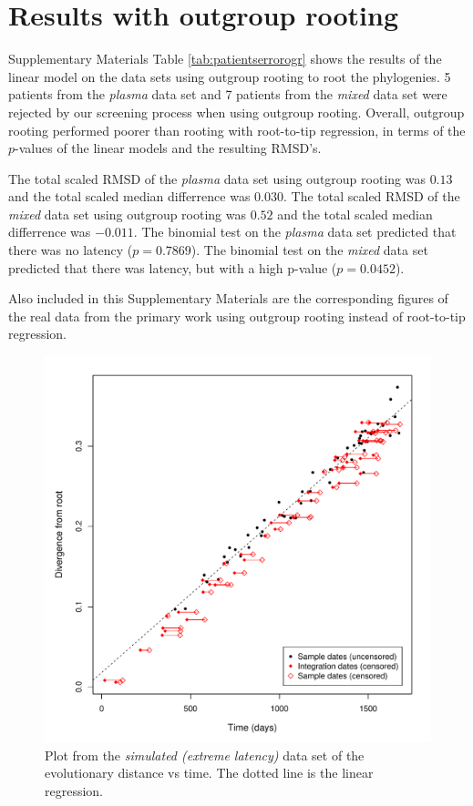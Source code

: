 \documentclass[12pt]{article}
\begin{document}
\section{Results with outgroup rooting} \label{sec:ogr}
Supplementary Materials Table \ref{tab:patientserrorogr} shows the results of the linear model on the data sets using outgroup rooting \cite{Huelsenbeck02} to root the phylogenies.
5 patients from the \emph{plasma} data set and 7 patients from the \emph{mixed} data set were rejected by our screening process when using outgroup rooting.
Overall, outgroup rooting performed poorer than rooting with root-to-tip regression, in terms of the $p$-values of the linear models and the resulting RMSD's.

The total scaled RMSD of the \emph{plasma} data set using outgroup rooting was $0.13$ and the total scaled median differrence was $0.030$.
The total scaled RMSD of the \emph{mixed} data set using outgroup rooting was $0.52$ and the total scaled median differrence was $-0.011$.
The binomial test on the \emph{plasma} data set predicted that there was no latency ($p = 0.7869$).
The binomial test on the \emph{mixed} data set predicted that there was latency, but with a high p-value ($p = 0.0452$).

Also included in this Supplementary Materials are the corresponding figures of the real data from the primary work using outgroup rooting instead of root-to-tip regression.






\begin{figure}[ht]
	\centering
	\includegraphics[width=12cm]{figures/simulated_extreme.pdf}
	\caption[Simulated Data]{Plot from the \emph{simulated (extreme latency)} data set of the evolutionary distance vs time. The dotted line is the linear regression.}
	\label{fig:resultsextreme}
\end{figure}
\end{document}
